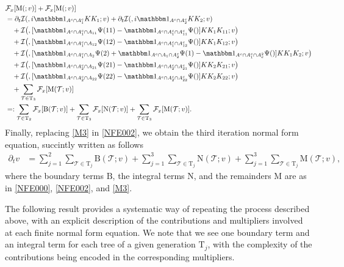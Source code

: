 \documentclass[%
11pt,  reqno]{amsart}
\makeatletter
\newcommand{\5}{\textup{V}}
\newcommand{\ind}{\mathbbm 1}
\newcommand{\dt}{\partial_t}
\theoremstyle{remark}
\newcommand{\TT}{\mathcal{T}}
\newcommand{\Tr}{\mathrm{T}}
\newcommand{\Ft}{{\mathcal{F}}}
\def\<#1>{\csname MH@symb@#1\endcsname}
\newcommand{\Ical}{\mathcal{I}}
\numberwithin{equation}{section}
\numberwithin{theorem}{section}
\newcommand{\MM}{\mathrm{M}}
\newcommand{\NN}{\mathrm{N}}
\newcommand{\BB}{\mathrm{B}}
\makeatother
\begin{document}
\begin{align}
&
 \Ft_x[ 
\MM(\<21>;v)
] 
+
 \Ft_x[ 
\MM(\<22>;v)
] 
\\
&
=
\dt \Ical(\<21>, i \ind_{A^c \cap A_1^c} KK_1 ; v) 
+
\dt\Ical(\<22>, i \ind_{A^c \cap A_2^c} KK_2 ; v) 
\\
&
\quad 
+ \Ical\big( \<31> ,  [\ind_{A^c\cap A_1^c \cap A_{11}} \Psi(11) - \ind_{A^c\cap A_1^c \cap A_{11}^c} \Psi(\<21>) ] KK_1 K_{11}  ; v \big)
\\
&
\quad 
+
 \Ical\big( \<32> , [ \ind_{A^c\cap A_1^c \cap A_{12}} \Psi(12) - \ind_{A^c \cap A_1^c \cap A_{12}^c} \Psi(\<21>)  ]KK_1 K_{12}  ; v \big)
\\
&
\quad 
+ \Ical\big( \<33> ,  [ \ind_{A^c\cap A_1^c \cap A_{2}} \Psi(2)+ \ind_{A^c \cap A_1 \cap A_2^c} \Psi(1)  - \ind_{A^c \cap A_1^c \cap A^2_c} \Psi(\<1>)] KK_1 K_2    ; v \big)
\\
&
\quad 
+ \Ical\big( \<34> , [ \ind_{A^c \cap A_2^c \cap A_{21}} \Psi(21) - \ind_{A^c \cap A_2^c \cap A_{21}^c} \Psi(\<22>) ]K K_2 K_{21}  ; v \big)
\\
&
\quad 
+ \Ical\big( \<35> ,[ \ind_{A^c \cap A_2^c \cap A_{22} } \Psi(22) - \ind_{A^c \cap A_2^c \cap A_{22}^c} \Psi(\<22>) ] K K_2 K_{22}    ; v \big)
\\
&
\quad 
+ \sum_{\TT\in\Tr_3} 
 \Ft_x[ 
\MM(\TT;v)
] 
\\
&
=: 
\sum_{\TT\in \Tr_2}  
\Ft_x[ 
\BB(\TT;v)
] 
 + \sum_{\TT \in \Tr_3} 
 \Ft_x[ 
\NN(\TT;v)
] 
 + \sum_{\TT\in\Tr_3} 
 \Ft_x[ 
\MM(\TT;v)
] 
. 
\label{M3}
\end{align}
Finally, replacing \eqref{M3} in \eqref{NFE002}, we obtain the third iteration normal form equation, succintly written as follows
\begin{align}
\dt v
&
= \sum_{j=1}^2 \sum_{\TT \in \Tr_j} \BB(\TT ; v) 
+ 
\sum_{j=1}^3 \sum_{\TT\in \Tr_j} \NN(\TT; v) 
+
\sum_{j=1}^3 \sum_{\TT\in \Tr_j} \MM(\TT; v), 
\end{align}
where the boundary terms $\BB$, the integral terms $\NN$, and the remainders $\MM$ are as in \eqref{NFE000}, \eqref{NFE002}, and \eqref{M3}. 





The following result provides a systematic way of repeating the process described above, with an explicit description of the contributions and multipliers involved at each finite normal form equation. 
We note that we see one boundary term and an integral term for each tree of a given generation $\Tr_j$, with the complexity of the contributions being encoded in the corresponding multipliers.
\end{document}
